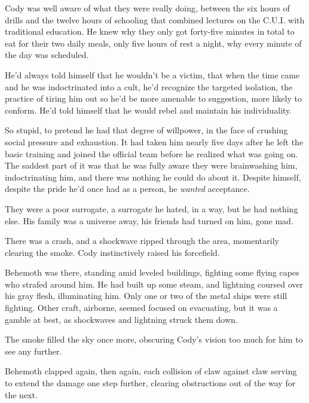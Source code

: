 Cody was well aware of what they were really doing, between the six hours of drills and the twelve hours of schooling that combined lectures on the C.U.I. with traditional education.  He knew why they only got forty-five minutes in total to eat for their two daily meals, only five hours of rest a night, why every minute of the day was scheduled.



He'd always told himself that he wouldn't be a victim, that when the time came and he was indoctrinated into a cult, he'd recognize the targeted isolation, the practice of tiring him out so he'd be more amenable to suggestion, more likely to conform.  He'd told himself that he would rebel and maintain his individuality.



So stupid, to pretend he had that degree of willpower, in the face of crushing social pressure and exhaustion.  It had taken him nearly five days after he left the basic training and joined the official team before he realized what was going on.  The saddest part of it was that he was fully aware they were brainwashing him, indoctrinating him, and there was nothing he could do about it.  Despite himself, despite the pride he'd once had as a person, he \emph{wanted} acceptance.



They were a poor surrogate, a surrogate he hated, in a way, but he had nothing else.  His family was a universe away, his friends had turned on him, gone mad.



There was a crash, and a shockwave ripped through the area, momentarily clearing the smoke.  Cody instinctively raised his forcefield.



Behemoth was there, standing amid leveled buildings, fighting some flying capes who strafed around him.  He had built up some steam, and lightning coursed over his gray flesh, illuminating him.  Only one or two of the metal ships were still fighting.  Other craft, airborne, seemed focused on evacuating, but it was a gamble at best, as shockwaves and lightning struck them down.



The smoke filled the sky once more, obscuring Cody's vision too much for him to see any further.



Behemoth clapped again, then again, each collision of claw against claw serving to extend the damage one step further, clearing obstructions out of the way for the next.



